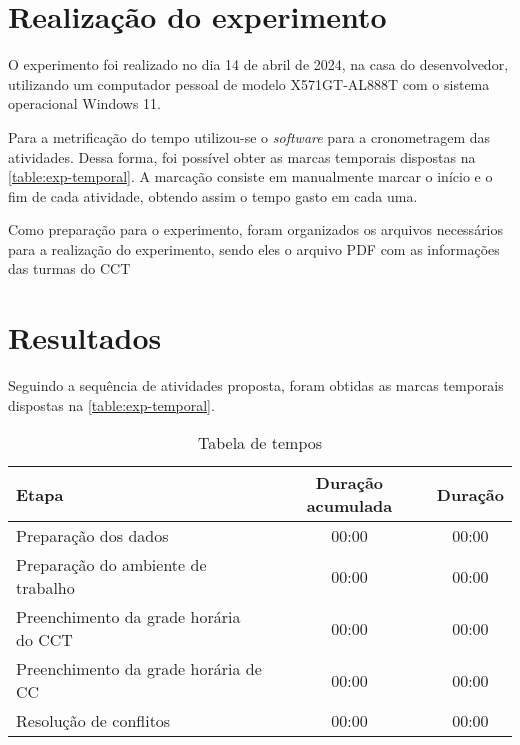 \section{Realização do experimento}

O experimento foi realizado no dia 14 de abril de 2024, na casa do desenvolvedor, utilizando um computador pessoal de modelo X571GT-AL888T com o sistema operacional Windows 11.

Para a metrificação do tempo utilizou-se o \textit{software}  para a cronometragem das atividades. Dessa forma, foi possível obter as marcas temporais dispostas na \autoref{table:exp-temporal}. A marcação consiste em manualmente marcar o início e o fim de cada atividade, obtendo assim o tempo gasto em cada uma.

Como preparação para o experimento, foram organizados os arquivos necessários para a realização do experimento, sendo eles o arquivo PDF com as informações das turmas do CCT

\section{Resultados}

Seguindo a sequência de atividades proposta, foram obtidas as marcas temporais dispostas na \autoref{table:exp-temporal}.

\begin{table}[htbp]\centering
  \caption{Tabela de tempos}
  \label{table:exp-temporal}
  \begin{tabular}{| l c c |}
    \hline
    \textbf{Etapa}                        & \textbf{Duração acumulada} & \textbf{Duração} \\
    \hline
    Preparação dos dados                  & 00:00                      & 00:00            \\
    Preparação do ambiente de trabalho    & 00:00                      & 00:00            \\
    Preenchimento da grade horária do CCT & 00:00                      & 00:00            \\
    Preenchimento da grade horária de CC  & 00:00                      & 00:00            \\
    Resolução de conflitos                & 00:00                      & 00:00            \\
    \hline
  \end{tabular}
\end{table}

